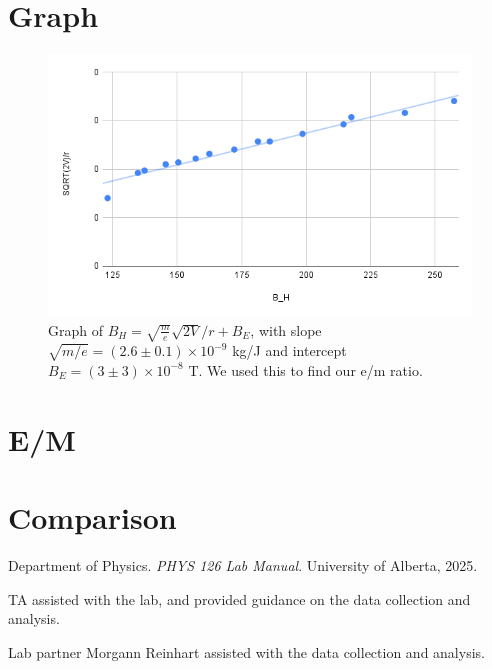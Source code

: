 \documentclass[12pt]{article}
\begin{document}
\section{Graph}
\begin{figure}[H]
    \centering
    \includegraphics[width=\textwidth]{chart.png}
    \caption{Graph of $B_H = \sqrt{\frac{m}{e}}\sqrt{2V}/r + B_E$, with slope $\sqrt{m/e} = (2.6 \pm 0.1) \times 10^{-9}$ kg/J and intercept $B_E = (3 \pm 3) \times 10^{-8}$ T.
        We used this to find our e/m ratio.}
    \label{fig:bh_vs_sqrt2v_r}
\end{figure}
\section{E/M}

\section{Comparison}

\renewcommand{\bibname}{5\ \ \References and Acknowledgements}
\begin{thebibliography}{9}
    Department of Physics. \textit{PHYS 126 Lab Manual}. University of Alberta, 2025.

    TA assisted with the lab, and provided guidance on the data collection and analysis.

    Lab partner Morgann Reinhart assisted with the data collection and analysis.
    
\end{thebibliography}
\end{document}
